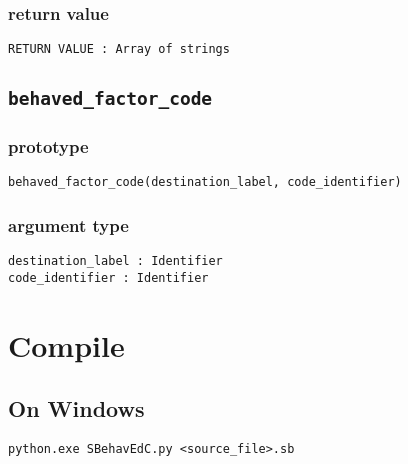 \documentclass{article}
\begin{document}
\subsubsection*{return value}
\texttt{RETURN VALUE : Array of strings}

\subsection{\texttt{behaved_factor_code}}
\subsubsection*{prototype}
\begin{lstlisting}
behaved_factor_code(destination_label, code_identifier)
\end{lstlisting}
\subsubsection*{argument type}
\texttt{destination_label : Identifier}\\
\texttt{code_identifier : Identifier}


\newpage
\section{Compile}
\subsection{On Windows}
\texttt{python.exe SBehavEdC.py <source_file>.sb}
\end{document}
